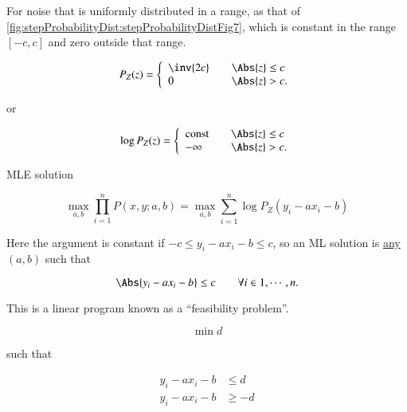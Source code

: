 For noise that is uniformly distributed in a range, as that of \cref{fig:stepProbabilityDist:stepProbabilityDistFig7}, which is constant in the range \( [-c,c] \) and zero outside that range.


\begin{dmath}\label{eqn:L1introduction:680}
P_Z(z) =
\left\{
\begin{array}{l l}
\inv{2 c} & \quad \mbox{\( \Abs{z} \le c\)} \\
0 & \quad \mbox{\( \Abs{z} > c. \)}
\end{array}
\right.
\end{dmath}

or

\begin{dmath}\label{eqn:L1introduction:700}
\log P_Z(z) =
\left\{
\begin{array}{l l}
\textrm{const} & \quad \mbox{\( \Abs{z} \le c\)} \\
-\infty & \quad \mbox{\( \Abs{z} > c. \)}
\end{array}
\right.
\end{dmath}

MLE solution

\begin{dmath}\label{eqn:L1introduction:720}
\max_{a,b} \prod_{i = 1}^n P(x, y; a, b)
=
\max_{a,b} \sum_{i = 1}^n \log P_Z( y_i - a x_i - b )
\end{dmath}

Here the argument is constant if \( -c \le y_i - a x_i - b \le c \), so an ML solution is \underline{any} \( (a,b) \) such that

\begin{equation}\label{eqn:L1introduction:740}
\Abs{ y_i - a x_i - b } \le c \qquad \forall i \in 1, \cdots, n.
\end{equation}

This is a linear program known as a ``feasibility problem''.

\begin{dmath}\label{eqn:L1introduction:760}
\min d
\end{dmath}

such that

\begin{dmath}\label{eqn:L1introduction:780}
\begin{aligned}
y_i - a x_i - b &\le d \\
y_i - a x_i - b &\ge -d
\end{aligned}
\end{dmath}

